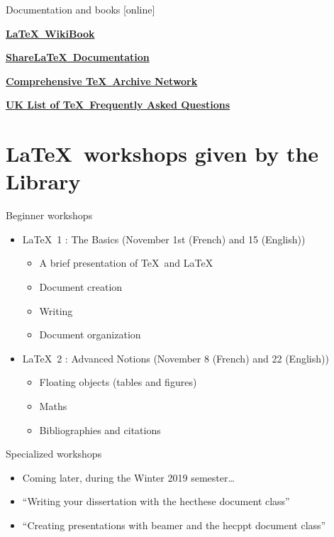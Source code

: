 \documentclass[aspectratio=1610,compress,t,gabaritb,french,english]{hecppt}
\newcommand{\HEClien}[2]{%
	\href{#1}{\textbf{#2} \faExternalLink}
}
\begin{document}
		\begin{frame}[c]{Documentation and books}
			
			\begin{thebibliography}{99}
					\HEClien{https://en.wikibooks.org/wiki/LaTeX}{\LaTeX\ WikiBook}
					\HEClien{https://fr.sharelatex.com/learn}{Share\LaTeX\ Documentation}
					\HEClien{https://ctan.org/}{Comprehensive \TeX\ Archive Network}
					\HEClien{http://www.tex.ac.uk/}{UK List of \TeX\ Frequently Asked Questions}
			\end{thebibliography}
		\end{frame}

\section{\LaTeX\ workshops given by the Library}

	\begin{frame}[c]{Beginner workshops}
	
		\begin{itemize}
			\item \LaTeX\ 1 : The Basics (November 1st (French) and 15 (English))
			\begin{itemize}
				\item A brief presentation of \TeX\ and \LaTeX
				\item Document creation
				\item Writing
				\item Document organization
			\end{itemize}
		\end{itemize}
	
		\begin{itemize}
			\item \LaTeX\ 2 : Advanced Notions (November 8 (French) and 22 (English))
			\begin{itemize}
				\item Floating objects (tables and figures)
				\item Maths
				\item Bibliographies and citations
			\end{itemize}
		\end{itemize}
		
	\end{frame}

	\begin{frame}[c]{Specialized workshops}
		
		\begin{itemize}
			\item Coming later, during the Winter 2019 semester\ldots
			\item ``Writing your dissertation with the hecthese document class''
			\item ``Creating presentations with beamer and the hecppt document class''
		\end{itemize}
	\end{frame}
	
\end{document}

